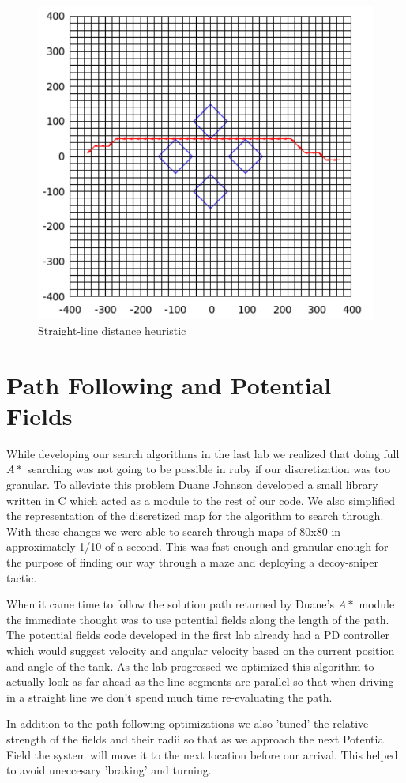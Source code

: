 \begin{figure}\label{fig:straight}
\begin{center}
\includegraphics[width=\textwidth]{heur3.png}
\caption{Straight-line distance heuristic}
\end{center}
\end{figure}


\section{Path Following and Potential Fields}
While developing our search algorithms in the last lab we realized that doing full $A*$ searching was not going to be possible in ruby if our discretization was too granular. To alleviate this problem Duane Johnson developed a small library written in C which acted as a module to the rest of our code.  We also simplified the representation of the discretized map for the algorithm to search through.  With these changes we were able to search through maps of 80x80 in approximately 1/10 of a second.  This was fast enough and granular enough for the purpose of finding our way through a maze and deploying a decoy-sniper tactic.
\par
When it came time to follow the solution path returned by Duane's $A*$ module the immediate thought was to use potential fields along the length of the path.  The potential fields code developed in the first lab already had a PD controller which would suggest velocity and angular velocity based on the current position and angle of the tank.  As the lab progressed we optimized this algorithm to actually look as far ahead as the line segments are parallel so that when driving in a straight line we don't spend much time re-evaluating the path.
\par
In addition to the path following optimizations we also 'tuned' the relative strength of the fields and their radii so that as we approach the next Potential Field the system will move it to the next location before our arrival.  This helped to avoid uneccesary 'braking' and turning.

